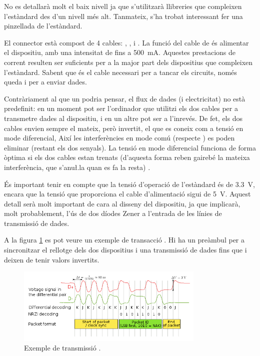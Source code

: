 No es detallarà molt el baix nivell ja que s'utilitzarà llibreries que
compleixen l'estàndard des d'un nivell més alt. Tanmateix, s'ha trobat
interessant fer una pinzellada de l'estàndard.

El connector  està compost de 4 cables: , ,
 i . La funció del cable de  és alimentar el
dispositiu, amb una intensitat de fins a
\SI[round-mode=places,round-precision=0]{500}{\milli\ampere}. Aquestes
prestacions de corrent resulten ser suficients per a la major part dels
dispositius que compleixen l'estàndard. Sabent que  és el cable
necessari per a tancar els circuits, només queda  i  per
a enviar dades.

Contràriament al que un podria pensar, el flux de dades (i electricitat) no
està predefinit: en un moment pot ser l'ordinador que utilitzi els dos cables
per a transmetre dades al dispositiu, i en un altre pot ser a l'inrevés. De fet,
els dos cables envien sempre el mateix, però invertit, el que es coneix com a
tensió en mode diferencial, Així les interferències en mode comú (respecte
) es poden eliminar (restant els dos senyals). La tensió en mode
diferencial funciona de forma òptima si els dos cables estan trenats (d'aquesta
forma reben gairebé la mateixa interferència, que s'anu\l.la quan es fa la
resta) \cite{DiffTension}.

És important tenir en compte que la tensió d'operació de l'estàndard 
és de
\SI[round-mode=places,round-precision=1]{3.3}{\volt}, encara que la tensió que
proporciona el cable d'alimentació sigui de
\SI[round-mode=places,round-precision=0]{5}{\volt}.
Aquest detall serà molt important de cara
al disseny del dispositiu, ja que implicarà, molt probablement, l'ús de dos
díodes Zener a l'entrada de les línies de transmissió de dades.

A la figura \ref{fig:usb-wave} es pot veure un exemple de transacció .
Hi ha un preàmbul per a sincronitzar el rellotge dels dos dispositius i una
transmissió de dades fins que  i  deixen de tenir valors
invertits.

\begin{figure}[ht]
    \centering
    \includegraphics[width=0.8\textwidth]{images/usb_signal_example.png}
    \caption{Exemple de transmissió . \cite{Contributors2024USB}}
    \label{fig:usb-wave}
\end{figure}

